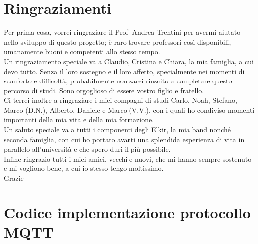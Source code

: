 \documentclass[12pt,a4paper]{report}
\begin{document}
\chapter*{Ringraziamenti}
Per prima cosa, vorrei ringraziare il Prof. Andrea Trentini per avermi aiutato nello sviluppo di questo progetto; è raro trovare professori così disponibili, umanamente buoni e competenti allo stesso tempo.\\
Un ringraziamento speciale va a Claudio, Cristina e Chiara, la mia famiglia, a cui devo tutto. Senza il loro sostegno  e il loro affetto, specialmente nei momenti di sconforto e difficoltà, probabilmente non sarei riuscito a completare questo percorso di studi. Sono orgoglioso di essere vostro figlio e fratello.\\
Ci terrei inoltre a ringraziare i miei compagni di studi Carlo, Noah, Stefano, Marco (D.N.), Alberto, Daniele e Marco (V.V.), con i quali ho condiviso momenti importanti della mia vita e della mia formazione.\\
Un saluto speciale va a tutti i componenti degli Elkir, la mia band nonché seconda famiglia, con cui ho portato avanti una splendida esperienza di vita in parallelo all'università e che spero duri il più possibile. \\
Infine ringrazio tutti i miei amici, vecchi e nuovi, che mi hanno sempre sostenuto e mi vogliono bene, a cui io stesso tengo moltissimo.\\
Grazie


\appendix
\chapter{Codice implementazione protocollo MQTT} \label{app:pubsub}
\end{document}
